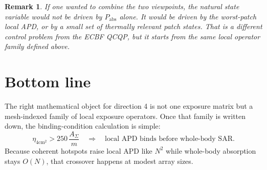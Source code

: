 \documentclass[11pt]{article}
\newtheorem{remark}{Remark}
\begin{document}
\begin{remark}
If one wanted to combine the two viewpoints, the natural state variable would
not be driven by $P_{\mathrm{abs}}$ alone. It would be driven by the
worst-patch local APD, or by a small set of thermally relevant patch states.
That is a different control problem from the ECBF QCQP, but it starts from the
same local operator family defined above.
\end{remark}

\section*{Bottom line}

The right mathematical object for direction 4 is not one exposure matrix but a
mesh-indexed family of local exposure operators. Once that family is written
down, the binding-condition calculation is simple:
\begin{equation}
  \eta_{4\mathrm{cm}^2} > 250\,\frac{A_\Sigma}{m}
  \quad \Longrightarrow \quad
  \text{local APD binds before whole-body SAR.}
\end{equation}
Because coherent hotspots raise local APD like $N^2$ while whole-body
absorption stays $O(N)$, that crossover happens at modest array sizes.
\end{document}
